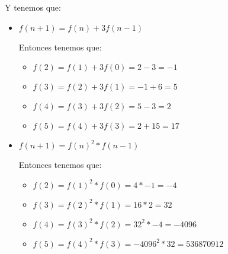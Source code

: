 \documentclass[12pt, fleqn]{article}                            %
\theoremstyle{break}                                            %
\begin{document}
    Y tenemos que:
    \begin{itemize}

        \item $f(n + 1) = f(n) + 3f(n - 1)$

            Entonces tenemos que:
            \begin{itemize}
            
                \item $f(2) 
                            = f(1) + 3f(0)
                            = 2 - 3
                            = -1
                    $

                \item $f(3) 
                            = f(2) + 3f(1)
                            = -1 + 6
                            = 5
                    $

                \item $f(4) 
                            = f(3) + 3f(2)
                            = 5 - 3
                            = 2
                    $

                \item $f(5) 
                            = f(4) + 3f(3)
                            = 2 + 15
                            = 17
                    $
            
            \end{itemize}

        \item $f(n + 1) = f(n)^2 * f(n - 1)$

            Entonces tenemos que:
            \begin{itemize}
            
                \item $f(2) 
                            = f(1)^2 * f(0)
                            = 4 * -1 
                            = -4
                    $

                \item $f(3) 
                            = f(2)^2 * f(1)
                            = 16 * 2
                            = 32
                    $

                \item $f(4) 
                            = f(3)^2 * f(2)
                            = 32^2 * -4
                            = -4096
                    $

                \item $f(5) 
                            = f(4)^2 * f(3)
                            = -4096^2 * 32
                            = 536870912
                    $
            

\end{itemize}
\end{itemize}
\end{document}
